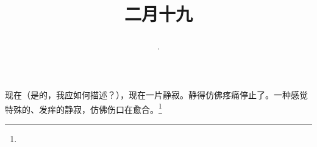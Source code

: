 \title{\date[d=28,m=3,y=2024][year:cn-y,年,month:cn,day:cn,日,·,weekday]·二月十九 }
现在（是的，我应如何描述？），现在一片静寂。静得仿佛疼痛停止了。一种感觉特殊的、发痒的静寂，仿佛伤口在愈合。\footnote{ }

